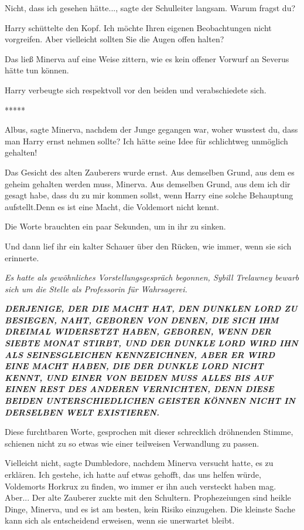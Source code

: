 \glqq{}Nicht, dass ich gesehen hätte...\grqq{}, sagte der Schulleiter langsam.
\glqq{}Warum fragst du?\grqq{}

Harry schüttelte den Kopf. \glqq{}Ich möchte Ihren eigenen Beobachtungen nicht
vorgreifen. Aber vielleicht sollten Sie die Augen offen halten?\grqq{}

Das ließ Minerva auf eine Weise zittern, wie es kein offener Vorwurf an Severus
hätte tun können.

Harry verbeugte sich respektvoll vor den beiden und verabschiedete sich.

\begin{center}*****\end{center}

\glqq{}Albus\grqq{}, sagte Minerva, nachdem der Junge gegangen war, \glqq{}woher
wusstest du, dass man Harry ernst nehmen sollte? Ich hätte seine Idee für
schlichtweg unmöglich gehalten!\grqq{}

Das Gesicht des alten Zauberers wurde ernst. \glqq{}Aus demselben Grund, aus dem
es geheim gehalten werden muss, Minerva. Aus demselben Grund, aus dem ich dir
gesagt habe, dass du zu mir kommen sollst, wenn Harry eine solche Behauptung
aufstellt.Denn es ist eine Macht, die Voldemort nicht kennt.\grqq{}

Die Worte brauchten ein paar Sekunden, um in ihr zu sinken.

Und dann lief ihr ein kalter Schauer über den Rücken, wie immer, wenn sie sich
erinnerte.

\emph{Es hatte als gewöhnliches Vorstellungsgespräch begonnen, Sybill Trelawney
bewarb sich um die Stelle als Professorin für Wahrsagerei.}

\emph{}\textbf{\emph{DERJENIGE, DER DIE MACHT HAT, DEN DUNKLEN LORD ZU BESIEGEN,
NAHT, GEBOREN VON DENEN, DIE SICH IHM DREIMAL WIDERSETZT HABEN, GEBOREN, WENN
DER SIEBTE MONAT STIRBT, UND DER DUNKLE LORD WIRD IHN ALS SEINESGLEICHEN
KENNZEICHNEN, ABER ER WIRD EINE MACHT HABEN, DIE DER DUNKLE LORD NICHT KENNT,
UND EINER VON BEIDEN MUSS ALLES BIS AUF EINEN REST DES ANDEREN VERNICHTEN, DENN
DIESE BEIDEN UNTERSCHIEDLICHEN GEISTER KÖNNEN NICHT IN DERSELBEN WELT
EXISTIEREN.}}

Diese furchtbaren Worte, gesprochen mit dieser schrecklich dröhnenden Stimme,
schienen nicht zu so etwas wie einer teilweisen Verwandlung zu passen.

\glqq{}Vielleicht nicht\grqq{}, sagte Dumbledore, nachdem Minerva versucht
hatte, es zu erklären. \glqq{}Ich gestehe, ich hatte auf etwas gehofft, das uns
helfen würde, Voldemorts Horkrux zu finden, wo immer er ihn auch versteckt haben
mag. Aber...\grqq{} Der alte Zauberer zuckte mit den Schultern.
\glqq{}Prophezeiungen sind heikle Dinge, Minerva, und es ist am besten, kein
Risiko einzugehen. Die kleinste Sache kann sich als entscheidend erweisen, wenn
sie unerwartet bleibt.\grqq{}

